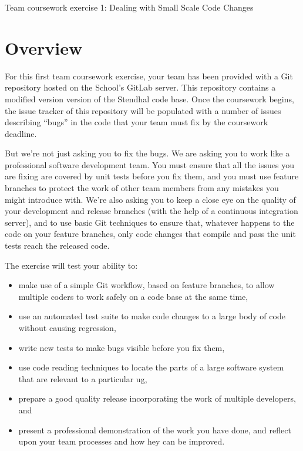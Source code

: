 \documentclass[
]{book}
\providecommand{\tightlist}{%
  \setlength{\itemsep}{0pt}\setlength{\parskip}{0pt}}
\begin{document}
Team coursework exercise 1: Dealing with Small Scale Code Changes

\hypertarget{overview}{%
\section{Overview}\label{overview}}

For this first team coursework exercise, your team has been provided with a Git repository hosted on the School's GitLab server. This repository contains a modified version version of the Stendhal code base. Once the coursework begins, the issue tracker of this repository will be populated with a number of issues describing ``bugs'' in the code that your team must fix by the coursework deadline.

But we're not just asking you to fix the bugs. We are asking you to work like a professional software development team. You must ensure that all the issues you are fixing are covered by unit tests before you fix them, and you must use feature branches to protect the work of other team members from any mistakes you might introduce with. We're also asking you to keep a close eye on the quality of your development and release branches (with the help of a continuous integration server), and to use basic Git techniques to ensure that, whatever happens to the code on your feature branches, only code changes that compile and pass the unit tests reach the released code.

The exercise will test your ability to:

\begin{itemize}
\tightlist
\item
  make use of a simple Git workflow, based on feature branches, to allow multiple coders to work safely on a code base at the same time,
\item
  use an automated test suite to make code changes to a large body of code without causing regression,
\item
  write new tests to make bugs visible before you fix them,
\item
  use code reading techniques to locate the parts of a large software system that are relevant to a particular ug,
\item
  prepare a good quality release incorporating the work of multiple developers, and\\
\item
  present a professional demonstration of the work you have done, and reflect upon your team processes and how hey can be improved.
\end{itemize}
\end{document}
